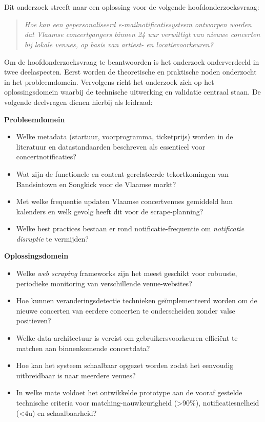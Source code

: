 \section{}%
\label{sec:onderzoeksvraag}

Dit onderzoek streeft naar een oplossing voor de volgende hoofdonderzoeksvraag:

\begin{quote}
\textit{Hoe kan een gepersonaliseerd e-mailnotificatiesysteem ontworpen worden dat Vlaamse concertgangers binnen 24 uur verwittigt van nieuwe concerten bij lokale venues, op basis van artiest- en locatievoorkeuren?}
\end{quote}

Om de hoofdonderzoeksvraag te beantwoorden is het onderzoek onderverdeeld in twee deelaspecten. Eerst worden de theoretische en praktische noden onderzocht in het probleemdomein. Vervolgens richt het onderzoek zich op het oplossingsdomein waarbij de technische uitwerking en validatie centraal staan. De volgende deelvragen dienen hierbij als leidraad:


\textbf{Probleemdomein}
\begin{itemize}
    \item Welke metadata (startuur, voorprogramma, ticketprijs) worden in de literatuur en datastandaarden beschreven als essentieel voor concertnotificaties?
    \item Wat zijn de functionele en content-gerelateerde tekortkomingen van Bandsintown en Songkick voor de Vlaamse markt?
    \item Met welke frequentie updaten Vlaamse concertvenues gemiddeld hun kalenders en welk gevolg heeft dit voor de scrape-planning?
    \item Welke best practices bestaan er rond notificatie-frequentie om \textit{notificatie disruptie} te vermijden?
\end{itemize}

\textbf{Oplossingsdomein}
\begin{itemize}
    \item Welke \textit{web scraping} frameworks zijn het meest geschikt voor robuuste, periodieke monitoring van verschillende venue-websites?
    \item Hoe kunnen veranderingsdetectie technieken geïmplementeerd worden om de nieuwe concerten van eerdere concerten te onderscheiden zonder valse positieven?
    \item Welke data-architectuur is vereist om gebruikersvoorkeuren efficiënt te matchen aan binnenkomende concertdata?
    \item Hoe kan het systeem schaalbaar opgezet worden zodat het eenvoudig uitbreidbaar is naar meerdere venues?
    \item In welke mate voldoet het ontwikkelde prototype aan de vooraf gestelde technische criteria voor matching-nauwkeurigheid (>90\%), notificatiesnelheid (<4u) en schaalbaarheid?
\end{itemize}

